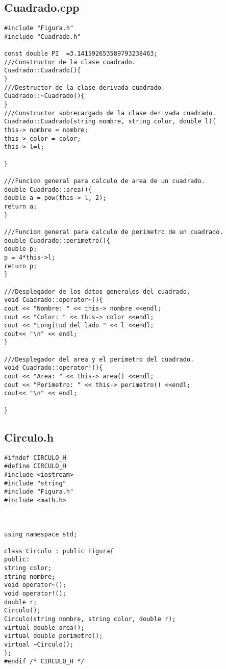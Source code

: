 \documentclass[11pt]{article}
\begin{document}
\subsection{Cuadrado.cpp}
\begin{lstlisting}
#include "Figura.h"
#include "Cuadrado.h"

const double PI  =3.141592653589793238463;
///Constructor de la clase cuadrado.
Cuadrado::Cuadrado(){
}
///Destructor de la clase derivada cuadrado.
Cuadrado::~Cuadrado(){
}
///Constructor sobrecargado de la clase derivada cuadrado.
Cuadrado::Cuadrado(string nombre, string color, double l){
this-> nombre = nombre;
this-> color = color;
this-> l=l;

}

///Funcion general para calculo de area de un cuadrado.
double Cuadrado::area(){
double a = pow(this-> l, 2);
return a;
}

///Funcion general para calculo de perimetro de un cuadrado.
double Cuadrado::perimetro(){
double p;
p = 4*this->l;
return p;
}

///Desplegador de los datos generales del cuadrado.
void Cuadrado::operator~(){
cout << "Nombre: " << this-> nombre <<endl;
cout << "Color: " << this-> color <<endl;
cout << "Longitud del lado " << l <<endl;
cout<< "\n" << endl;
}

///Desplegador del area y el perimetro del cuadrado.
void Cuadrado::operator!(){
cout << "Area: " << this-> area() <<endl;
cout << "Perimetro: " << this-> perimetro() <<endl;
cout<< "\n" << endl;

}

\end{lstlisting}

\subsection{Circulo.h}
\begin{lstlisting}
#ifndef CIRCULO_H
#define CIRCULO_H
#include <iostream>
#include "string"
#include "Figura.h"
#include <math.h> 



using namespace std;

class Circulo : public Figura{
public:
string color;
string nombre;
void operator~();
void operator!();
double r;
Circulo();
Circulo(string nombre, string color, double r);
virtual double area();
virtual double perimetro();
virtual ~Circulo();
};
#endif /* CIRCULO_H */

\end{lstlisting}
\end{document}

